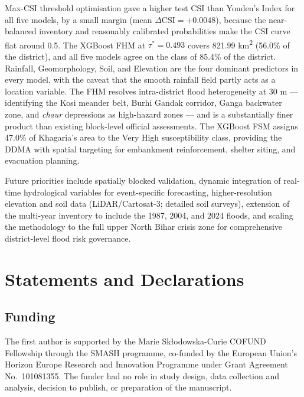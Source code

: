 \documentclass[12pt, a4paper]{article}
\begin{document}
Max-CSI threshold optimisation gave a higher test CSI than Youden's Index for all five models, by a small margin (mean $\Delta\text{CSI} = +0.0048$), because the near-balanced inventory and reasonably calibrated probabilities make the CSI curve flat around 0.5. The XGBoost FHM at $\tau^* = 0.493$ covers 821.99 km\textsuperscript{2} (56.0\% of the district), and all five models agree on the class of 85.4\% of the district. Rainfall, Geomorphology, Soil, and Elevation are the four dominant predictors in every model, with the caveat that the smooth rainfall field partly acts as a location variable. The FHM resolves intra-district flood heterogeneity at 30 m --- identifying the Kosi meander belt, Burhi Gandak corridor, Ganga backwater zone, and \textit{chaur} depressions as high-hazard zones --- and is a substantially finer product than existing block-level official assessments. The XGBoost FSM assigns 47.0\% of Khagaria's area to the Very High susceptibility class, providing the DDMA with spatial targeting for embankment reinforcement, shelter siting, and evacuation planning.

Future priorities include spatially blocked validation, dynamic integration of real-time hydrological variables for event-specific forecasting, higher-resolution elevation and soil data (LiDAR/Cartosat-3; detailed soil surveys), extension of the multi-year inventory to include the 1987, 2004, and 2024 floods, and scaling the methodology to the full upper North Bihar crisis zone for comprehensive district-level flood risk governance.


\section*{Statements and Declarations}

%
%
%
\subsection*{Funding}
The first author is supported by the Marie Sk\l odowska-Curie COFUND Fellowship through the SMASH programme, co-funded by the European Union's Horizon Europe Research and Innovation Programme under Grant Agreement No.\ 101081355. The funder had no role in study design, data collection and analysis, decision to publish, or preparation of the manuscript.
\end{document}
